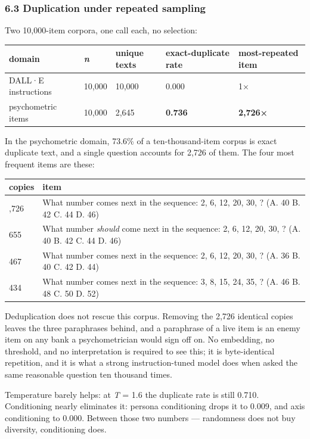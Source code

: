 \documentclass[
  11pt,
]{article}
\theoremstyle{plain}
\theoremstyle{definition}
\begin{document}
\subsubsection{6.3 Duplication under repeated
sampling}\label{63-duplication-under-repeated-sampling}

Two 10,000-item corpora, one call each, no selection:

\begin{longtable}[]{@{}lllll@{}}
\toprule\noalign{}
domain & \emph{n} & unique texts & exact-duplicate rate & most-repeated
item \\
\midrule\noalign{}
\endhead
\bottomrule\noalign{}
\endlastfoot
DALL·E instructions & 10,000 & 10,000 & 0.000 & 1× \\
psychometric items & 10,000 & 2,645 & \textbf{0.736} &
\textbf{2,726×} \\
\end{longtable}

In the psychometric domain, 73.6\% of a ten-thousand-item corpus is
exact duplicate text, and a single question accounts for 2,726 of them.
The four most frequent items are these:

\begin{longtable}[]{@{}ll@{}}
\toprule\noalign{}
copies & item \\
\midrule\noalign{}
\endhead
\bottomrule\noalign{}
\endlastfoot
2,726 & What number comes next in the sequence: 2, 6, 12, 20, 30, ? (A.
40 B. 42 C. 44 D. 46) \\
655 & What number \emph{should} come next in the sequence: 2, 6, 12, 20,
30, ? (A. 40 B. 42 C. 44 D. 46) \\
467 & What number comes next in the sequence: 2, 6, 12, 20, 30, ? (A. 36
B. 40 C. 42 D. 44) \\
434 & What number comes next in the sequence: 3, 8, 15, 24, 35, ? (A. 46
B. 48 C. 50 D. 52) \\
\end{longtable}

Deduplication does not rescue this corpus. Removing the 2,726 identical
copies leaves the three paraphrases behind, and a paraphrase of a live
item is an enemy item on any bank a psychometrician would sign off on.
No embedding, no threshold, and no interpretation is required to see
this; it is byte-identical repetition, and it is what a strong
instruction-tuned model does when asked the same reasonable question ten
thousand times.

Temperature barely helps: at \emph{T} = 1.6 the duplicate rate is still
0.710. Conditioning nearly eliminates it: persona conditioning drops it
to 0.009, and axis conditioning to 0.000. Between those two numbers ---
randomness does not buy diversity, conditioning does.
\end{document}
